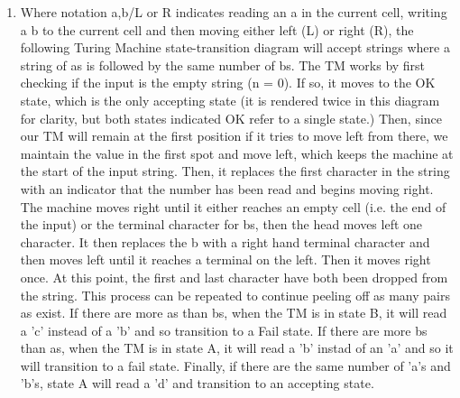 


\begin{enumerate}
    \item Where notation a,b/{L or R} indicates reading an a in the current cell, writing a b to the current cell and then moving either left (L) or right (R), the following Turing Machine state-transition diagram will accept strings where a string of as is followed by the same number of bs. The TM works by first checking if the input is the empty string (n = 0). If so, it moves to the OK state, which is the only accepting state (it is rendered twice in this diagram for clarity, but both states indicated OK refer to a single state.) Then, since our TM will remain at the first position if it tries to move left from there, we maintain the value in the first spot and move left, which keeps the machine at the start of the input string. Then, it replaces the first character in the string with an indicator that the number has been read and begins moving right. The machine moves right until it either reaches an empty cell (i.e. the end of the input) or the terminal character for bs, then the head moves left one character. It then replaces the b with a right hand terminal character and then moves left until it reaches a terminal on the left. Then it moves right once. At this point, the first and last character have both been dropped from the string. This process can be repeated to continue peeling off as many pairs as exist. If there are more as than bs, when the TM is in state B, it will read a 'c' instead of a 'b' and so transition to a Fail state. If there are more bs than as, when the TM is in state A, it will read a 'b' instad of an 'a' and so it will transition to a fail state. Finally, if there are the same number of 'a's and 'b's, state A will read a 'd' and transition to an accepting state.
    \begin{center}
\end{center}
\end{enumerate}
